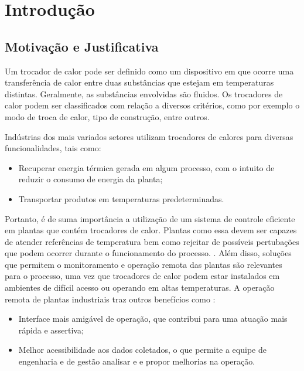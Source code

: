 \chapter{Introdução}
	\section{Motivação e Justificativa}

	Um trocador de calor pode ser definido como um dispositivo em que ocorre uma transferência de calor entre duas substâncias que estejam em temperaturas distintas. Geralmente, as substâncias envolvidas são fluidos. Os trocadores de calor podem ser classificados com relação a diversos critérios, como por exemplo o modo de troca de calor, tipo de construção, entre outros. \cite{kreith2011}
	
	Indústrias dos mais variados setores utilizam trocadores de calores para diversas funcionalidades, tais como:
	
	\begin{itemize}
		\item 
		Recuperar energia térmica gerada em algum processo, com o intuito de reduzir o consumo de energia da planta;
		\item 
		Transportar produtos em temperaturas predeterminadas.
	\end{itemize}

	Portanto, é de suma importância a utilização de um sistema de controle eficiente em plantas que contém trocadores de calor. Plantas como essa devem ser capazes de atender referências de temperatura bem como rejeitar de possíveis pertubações que podem ocorrer durante o funcionamento do processo. \cite{novazzi2007}. Além disso, soluções que permitem o monitoramento e operação remota das plantas são relevantes para o processo, uma vez que trocadores de calor podem estar instalados em ambientes de difícil acesso ou operando em altas temperaturas. A operação remota de plantas industriais traz outros benefícios como \cite{babau2009}:
	\begin{itemize}
		\item 
		Interface mais amigável de operação, que contribui para uma atuação mais rápida e assertiva;
		\item 
		Melhor acessibilidade aos dados coletados, o que permite a equipe de engenharia e de gestão analisar e e propor melhorias na operação.
	\end{itemize}

